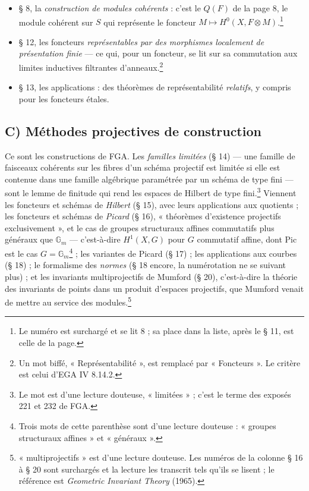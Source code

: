 \documentclass[11pt,a4paper]{article}
\begin{document}
\begin{itemize}
{  le seul sens que « cas Greenberg » puisse avoir ici.}
  \item § 8, la \emph{construction de modules cohérents} : c'est le
  $Q(F)$ de la page 8, le module cohérent sur $S$ qui représente le foncteur
  $M \mapsto H^0(X, F \otimes M)$.\footnote{Le numéro est surchargé et se lit
  8 ; sa place dans la liste, après le § 11, est celle de la page.}
  \item § 12, les foncteurs \emph{représentables par des morphismes
  localement de présentation finie} — ce qui, pour un foncteur, se lit sur sa
  commutation aux limites inductives filtrantes d'anneaux.\footnote{Un mot
  biffé, « Représentabilité », est remplacé par « Foncteurs ». Le critère est
  celui d'EGA IV 8.14.2.}
  \item § 13, les applications : des théorèmes de représentabilité
  \emph{relatifs}, y compris pour les foncteurs étales.
\end{itemize}

\subsection*{C) Méthodes projectives de construction}

Ce sont les constructions de FGA. Les \emph{familles limitées} (§ 14) — une
famille de faisceaux cohérents sur les fibres d'un schéma projectif est
limitée si elle est contenue dans une famille algébrique paramétrée par un
schéma de type fini — sont le lemme de finitude qui rend les espaces de
Hilbert de type fini.\footnote{Le mot est d'une lecture douteuse, « limitées » ;
c'est le terme des exposés 221 et 232 de FGA.} Viennent les foncteurs et
schémas de \emph{Hilbert} (§ 15), avec leurs applications aux quotients ; les
foncteurs et schémas de \emph{Picard} (§ 16), « théorèmes d'existence
projectifs exclusivement », et le cas de groupes structuraux affines
commutatifs plus généraux que $\mathbb{G}_m$ — c'est-à-dire $H^1(X, G)$ pour
$G$ commutatif affine, dont Pic est le cas $G =
\mathbb{G}_m$\footnote{Trois mots de cette parenthèse sont d'une lecture
douteuse : « groupes structuraux affines » et « généraux ».} ; les variantes
de Picard (§ 17) ; les applications aux courbes (§ 18) ; le formalisme des
\emph{normes} (§ 18 encore, la numérotation ne se suivant plus) ; et les
invariants multiprojectifs de Mumford (§ 20), c'est-à-dire la théorie des
invariants de points dans un produit d'espaces projectifs, que Mumford venait
de mettre au service des modules.\footnote{« multiprojectifs » est d'une
lecture douteuse. Les numéros de la colonne § 16 à § 20 sont surchargés et la
lecture les transcrit tels qu'ils se lisent ; le référence est \emph{Geometric
Invariant Theory} (1965).}
\end{document}
